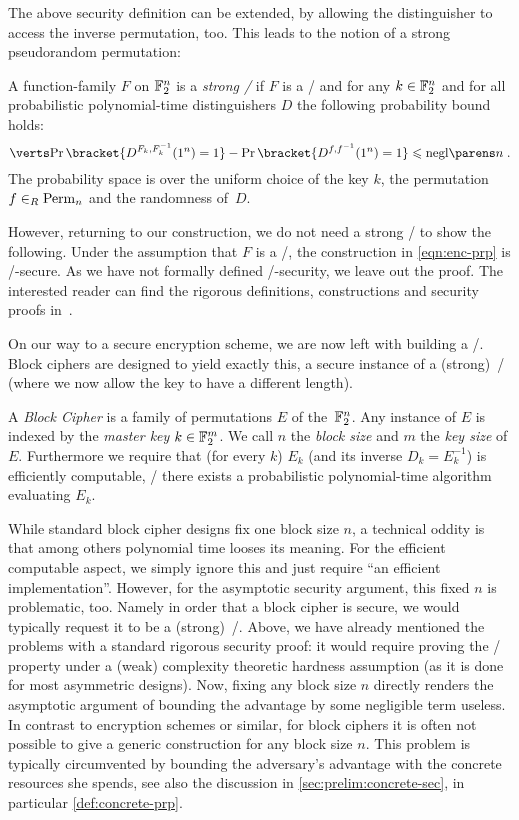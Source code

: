 The above security definition can be extended, by allowing the distinguisher to access the inverse permutation, too.
This leads to the notion of a strong pseudorandom permutation:
\begin{definition}\label{def:strong-prp}
    A function-family $F$ on $\mathbb{F}_2^n$ is a \emph{strong \PRPl/} if $F$ is a \PRP/ and for any $k \in \mathbb{F}_2^n$ and for all probabilistic polynomial-time distinguishers $D$ the following probability bound holds:
    \begin{equation*}
        \abs{\Prob\bracket{D^{F_k,F_k^{-1}}(1^n) = 1} - \Prob\bracket{D^{f,f^{-1}}(1^n) = 1}} \leqslant \negl{n}\;.
    \end{equation*}
    The probability space is over the uniform choice of the key $k$, the permutation $f \in_R \perm/_n$ and the randomness of~$D$.
\end{definition}

However, returning to our construction, we do not need a strong \PRP/ to show the following.
Under the assumption that $F$ is a \PRP/, the construction in \cref{eqn:enc-prp} is \CPA/-secure.
As we have not formally defined \CPA/-security, we leave out the proof.
The interested reader can find the rigorous definitions, constructions and security proofs in~\cite{katzlindell}.

On our way to a secure encryption scheme, we are now left with building a \PRP/.
Block ciphers are designed to yield exactly this, a secure instance of a (strong)~\PRP/ (where we now allow the key to have a different length).
\begin{definition}\label{def:bc}
    A \emph{Block Cipher} is a family of permutations $E$ of the~$\mathbb{F}_2^n$.
    Any instance of $E$ is indexed by the \emph{master key} $k \in \mathbb{F}_2^m$.
    We call $n$ the \emph{block size} and $m$ the \emph{key size} of $E$.
    Furthermore we require that (for every $k$) $E_k$ (and its inverse $D_k = E_k^{-1}$) is efficiently computable, \ie/ there exists a probabilistic polynomial-time algorithm evaluating $E_k$.
\end{definition}
While standard block cipher designs fix one block size $n$, a technical oddity is that among others polynomial time looses its meaning.
For the efficient computable aspect, we simply ignore this and just require \enquote{an efficient implementation}.
However, for the asymptotic security argument, this fixed $n$ is problematic, too.
Namely in order that a block cipher is secure, we would typically request it to be a (strong)~\PRP/.
Above, we have already mentioned the problems with a standard rigorous security proof: it would require proving the \PRP/ property under a (weak) complexity theoretic hardness assumption (as it is done for most asymmetric designs).
Now, fixing any block size $n$ directly renders the asymptotic argument of bounding the advantage by some negligible term useless.
In contrast to encryption schemes or similar, for block ciphers it is often not possible to give a generic construction for any block size $n$.
This problem is typically circumvented by bounding the adversary's advantage with the concrete resources she spends, see also the discussion in \cref{sec:prelim:concrete-sec}, in particular \cref{def:concrete-prp}.

